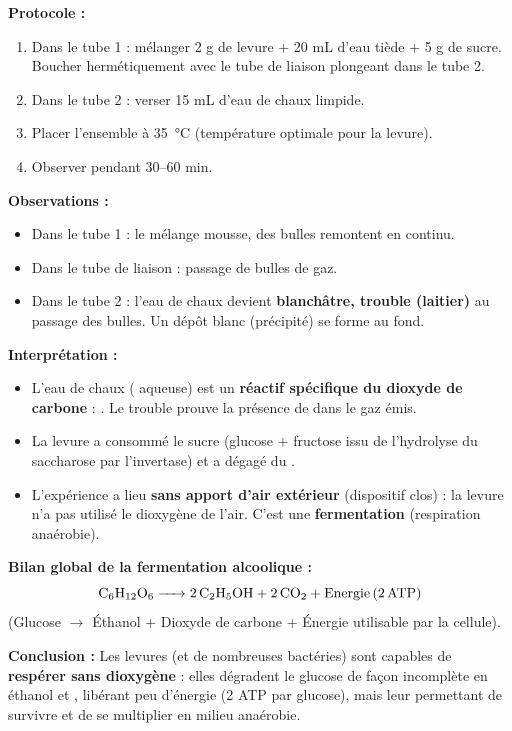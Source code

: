 \documentclass[11pt]{article}
\begin{document}
\begin{experience}
\textbf{Protocole :}
\begin{enumerate}
    \item Dans le tube 1 : mélanger 2 g de levure + 20 mL d'eau tiède + 5 g de sucre. Boucher hermétiquement avec le tube de liaison plongeant dans le tube 2.
    \item Dans le tube 2 : verser 15 mL d'eau de chaux limpide.
    \item Placer l'ensemble à \SI{35}{\degreeCelsius} (température optimale pour la levure).
    \item Observer pendant 30--60 min.
\end{enumerate}

\textbf{Observations :}
\begin{itemize}
    \item Dans le tube 1 : le mélange mousse, des bulles remontent en continu.
    \item Dans le tube de liaison : passage de bulles de gaz.
    \item Dans le tube 2 : l'eau de chaux devient \textbf{blanchâtre, trouble (laitier)} au passage des bulles. Un dépôt blanc (précipité) se forme au fond.
\end{itemize}

\textbf{Interprétation :}
\begin{itemize}
    \item L'eau de chaux ( aqueuse) est un \textbf{réactif spécifique du dioxyde de carbone } : . Le trouble prouve la présence de  dans le gaz émis.
    \item La levure a consommé le sucre (glucose + fructose issu de l'hydrolyse du saccharose par l'invertase) et a dégagé du .
    \item L'expérience a lieu \textbf{sans apport d'air extérieur} (dispositif clos) : la levure n'a pas utilisé le dioxygène  de l'air. C'est une \textbf{fermentation} (respiration anaérobie).
\end{itemize}

\textbf{Bilan global de la fermentation alcoolique :}
\[
\ce{C6H12O6 -> 2 C2H5OH + 2 CO2 + Energie (2 ATP)}
\]
(Glucose $\rightarrow$ Éthanol + Dioxyde de carbone + Énergie utilisable par la cellule).

\textbf{Conclusion :} Les levures (et de nombreuses bactéries) sont capables de \textbf{respérer sans dioxygène} : elles dégradent le glucose de façon incomplète en éthanol et , libérant peu d'énergie (2 ATP par glucose), mais leur permettant de survivre et de se multiplier en milieu anaérobie.
\end{experience}
\end{document}
